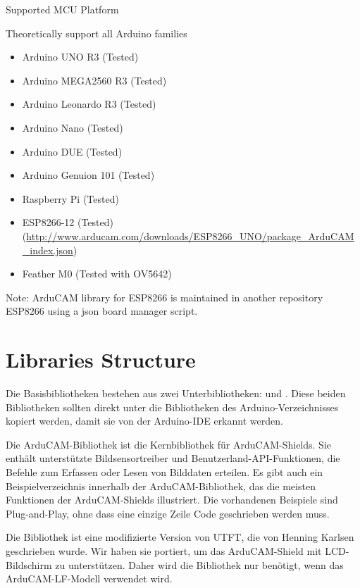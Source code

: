 Supported MCU Platform

Theoretically support all Arduino families

\begin{itemize}
  \item Arduino UNO R3 (Tested)
  \item Arduino MEGA2560 R3 (Tested)
  \item Arduino Leonardo R3 (Tested)
  \item Arduino Nano (Tested)
  \item Arduino DUE (Tested)
  \item Arduino Genuion 101 (Tested)
  \item Raspberry Pi (Tested)
  \item ESP8266-12 (Tested) (\url{http://www.arducam.com/downloads/ESP8266_UNO/package_ArduCAM_index.json})
  \item Feather M0 (Tested with OV5642)
\end{itemize}


Note: ArduCAM library for ESP8266 is maintained in another repository ESP8266 using a json board manager script.


\section{Libraries Structure}

Die Basisbibliotheken bestehen aus zwei Unterbibliotheken:  und . Diese beiden Bibliotheken sollten direkt unter die Bibliotheken des Arduino-Verzeichnisses kopiert werden, damit sie von der Arduino-IDE erkannt werden.

Die ArduCAM-Bibliothek ist die Kernbibliothek für ArduCAM-Shields. Sie enthält unterstützte Bildsensortreiber und Benutzerland-API-Funktionen, die Befehle zum Erfassen oder Lesen von Bilddaten erteilen. Es gibt auch ein Beispielverzeichnis innerhalb der ArduCAM-Bibliothek, das die meisten Funktionen der ArduCAM-Shields illustriert. Die vorhandenen Beispiele sind Plug-and-Play, ohne dass eine einzige Zeile Code geschrieben werden muss.

Die Bibliothek  ist eine modifizierte Version von UTFT, die von Henning Karlsen geschrieben wurde. Wir haben sie portiert, um das ArduCAM-Shield mit LCD-Bildschirm zu unterstützen. Daher wird die Bibliothek  nur benötigt, wenn das ArduCAM-LF-Modell verwendet wird.




